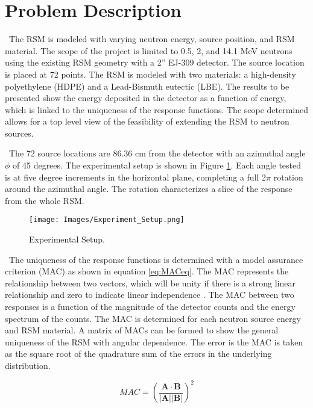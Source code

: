 \documentclass[journal]{IEEEtran}
\let\MYoriglatexcaption\caption
\renewcommand{\caption}[2][\relax]{\MYoriglatexcaption[#2]{#2}}
\begin{document}
	\section{Problem Description}
	\ The RSM is modeled with varying neutron energy, source position, and RSM material.  The scope of the project is limited to 0.5, 2, and 14.1 MeV neutrons using the existing RSM geometry with a 2'' EJ-309 detector. The source location is placed at 72 points. The RSM is modeled with two materials: a high-density polyethylene (HDPE) and a Lead-Bismuth eutectic (LBE).  The results to be presented show the energy deposited in the detector as a function of energy, which is linked to the uniqueness of the response functions.  The scope determined allows for a  top level view of the feasibility of extending the RSM to neutron sources. 
	
	\ The 72 source locations are 86.36 cm from the detector with an azimuthal angle $\phi$ of 45 degrees. The experimental setup is shown in Figure \ref{fig:3d}\cite{RSM_T}.  Each angle tested is at five degree increments in the horizontal plane, completing a full 2$\pi$ rotation around the azimuthal angle.  The rotation characterizes a slice of the response from the whole RSM. 
	
	\begin{figure}[h]
	    \texttt{[image: Images/Experiment\_Setup.png]}
	    \caption{Experimental Setup.}
	    \label{fig:3d}
    \end{figure}
	
	\ The uniqueness of the response functions is determined with a model assurance criterion (MAC) as shown in equation \ref{eq:MACeq}.  The MAC represents the relationship between two vectors, which will be unity if there is a strong linear relationship and zero to indicate linear independence \cite{RSM_T}.  The MAC between two responses is a function of the magnitude of the detector counts and the energy spectrum of the counts.  The MAC is determined for each neutron source energy and RSM material.  A matrix of MACs can be formed to show the general uniqueness of the RSM with angular dependence. The error is the MAC is taken as the square root of the quadrature sum of the errors in the underlying distribution. 
	
	\begin{equation} \label{eq:MACeq}
	MAC = (\dfrac{\mathbf{A} \cdot \mathbf{B}}{|\mathbf{A}| |\mathbf{B}|})^2  
	\end{equation}
     
\end{document}
